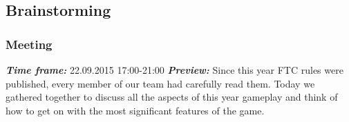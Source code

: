 \subsection{Brainstorming}

\addtocounter{number_of_meeting}{1}
\subsubsection{ Meeting}
	\textit{\textbf{Time frame:}} 22.09.2015 17:00-21:00 \newline
	\textit{\textbf{Preview:}} Since this year FTC rules were published, every member of our team had carefully read them. Today we gathered together to discuss all the aspects of this year gameplay and think of how to get on with the most significant features of the game. \newline
	

